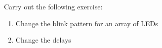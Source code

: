 







\begin{exercise}
  Carry out the following exercise:
  \begin{enumerate}
    \item Change the blink pattern for an array of LEDs
    \item Change the delays
  \end{enumerate}
\end{exercise}

